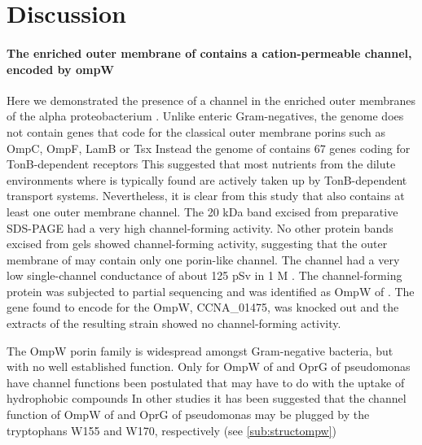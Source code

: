 \section{Discussion}
\label{sec:porin-discussion}

\paragraph{The enriched outer membrane of \caulobacter contains a cation-permeable channel, encoded by ompW}
Here we demonstrated the presence of a channel in the enriched outer membranes of the alpha proteobacterium \caulobacter. Unlike enteric Gram-negatives, the genome does not contain genes that code for the classical outer membrane porins such as OmpC, OmpF, LamB or Tsx Instead the genome of \caulobacter contains 67 genes coding for TonB-dependent receptors This suggested that most nutrients from the dilute environments where \caulobacter is typically found are actively taken up by TonB-dependent transport systems. Nevertheless, it is clear from this study that \caulobacter also contains at least one outer membrane channel. The 20 kDa band excised from preparative \ac{SDS-PAGE} had a very high channel-forming activity. No other protein bands excised from gels showed channel-forming activity, suggesting that the outer membrane of \caulobacter may contain only one porin-like channel. The channel had a very low single-channel conductance of about 125 \si{\pico\sievert} in 1 M . The channel-forming protein was subjected to partial sequencing and was identified as OmpW of \caulobacter. The gene found to encode for the OmpW, CCNA\_01475, was knocked out and the extracts of the resulting strain showed no channel-forming activity.

 The OmpW porin family is widespread amongst Gram-negative bacteria, but with no well established function. Only for OmpW of \ecoli and OprG of \ac{pseudomonas} have channel functions been postulated that may have to do with the uptake of hydrophobic compounds In other studies it has been suggested that the channel function of OmpW of \ecoli and OprG of \ac{pseudomonas} may be plugged by  the tryptophans W155 and W170, respectively (see \cref{sub:structompw}) 

